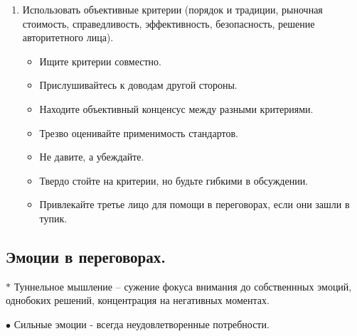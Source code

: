 \documentclass[12pt,a4paper]{report}
\begin{document}
\begin{enumerate}
	\item Использовать объективные критерии (порядок и традиции, рыночная стоимость, справедливость, эффективность, безопасность, решение авторитетного лица).
	\begin{itemize}
		\item Ищите критерии совместно.
		\item Прислушивайтесь к доводам другой стороны.
		\item Находите объективный конценсус между разными критериями.
		\item Трезво оценивайте применимость стандартов.
		\item Не давите, а убеждайте.
		\item Твердо стойте на критерии, но будьте гибкими в обсуждении.
		\item Привлекайте третье лицо для помощи в переговорах, если они зашли в тупик.
	\end{itemize}
\end{enumerate}

\subsection*{Эмоции в переговорах.}
$\ast$ Туннельное мышление -- сужение фокуса внимания до собственнных эмоций, однобоких решений, концентрация на негативных моментах.

\medskip
$\bullet$ Сильные эмоции - всегда неудовлетворенные потребности.
\end{document}
